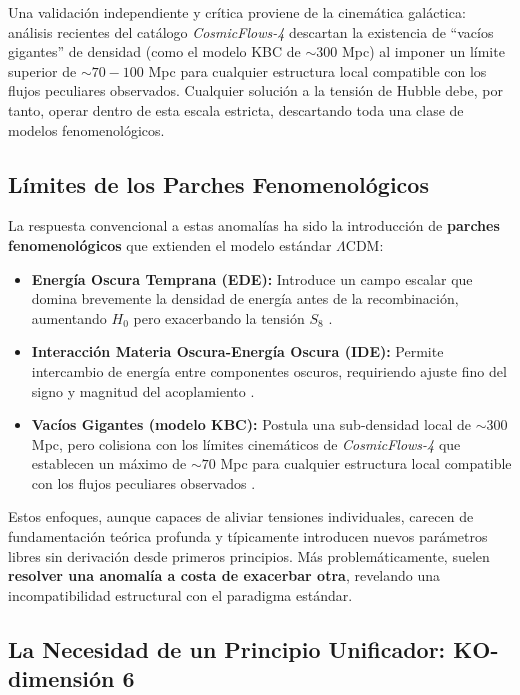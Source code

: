 \documentclass[11pt, a4paper]{article}
\theoremstyle{plain}
\theoremstyle{definition}
\begin{document}
Una validación independiente y crítica proviene de la cinemática galáctica: análisis recientes del catálogo \textit{CosmicFlows-4} \cite{Mazurenko2024} descartan la existencia de ``vacíos gigantes'' de densidad (como el modelo KBC de $\sim 300$ Mpc) al imponer un límite superior de $\sim 70-100$ Mpc para cualquier estructura local compatible con los flujos peculiares observados. Cualquier solución a la tensión de Hubble debe, por tanto, operar dentro de esta escala estricta, descartando toda una clase de modelos fenomenológicos.

\subsection{Límites de los Parches Fenomenológicos}

La respuesta convencional a estas anomalías ha sido la introducción de \textbf{parches fenomenológicos} que extienden el modelo estándar $\Lambda$CDM:

\begin{itemize}
    \item \textbf{Energía Oscura Temprana (EDE):} Introduce un campo escalar que domina brevemente la densidad de energía antes de la recombinación, aumentando $H_0$ pero exacerbando la tensión $S_8$ \cite{Poulin2019}.
    
    \item \textbf{Interacción Materia Oscura-Energía Oscura (IDE):} Permite intercambio de energía entre componentes oscuros, requiriendo ajuste fino del signo y magnitud del acoplamiento \cite{DiValentino2020}.
    
    \item \textbf{Vacíos Gigantes (modelo KBC):} Postula una sub-densidad local de $\sim 300$ Mpc, pero colisiona con los límites cinemáticos de \textit{CosmicFlows-4} que establecen un máximo de $\sim 70$ Mpc para cualquier estructura local compatible con los flujos peculiares observados \cite{Mazurenko2024}.
\end{itemize}

Estos enfoques, aunque capaces de aliviar tensiones individuales, carecen de fundamentación teórica profunda y típicamente introducen nuevos parámetros libres sin derivación desde primeros principios. Más problemáticamente, suelen \textbf{resolver una anomalía a costa de exacerbar otra}, revelando una incompatibilidad estructural con el paradigma estándar.

\subsection{La Necesidad de un Principio Unificador: KO-dimensión 6}
\end{document}
